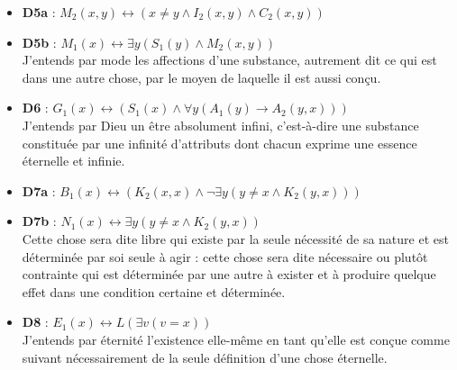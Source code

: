 \documentclass[10pt,a3paper]{article}
\begin{document}
\begin{itemize}
    \item \textbf{D5a} : $M_2(x,y) \leftrightarrow (x \neq y \land I_2(x,y) \land C_2(x,y))$ \\    
    \item \textbf{D5b} : $M_1(x) \leftrightarrow \exists y (S_1(y) \land M_2(x,y))$ \\
    J’entends par mode les affections d’une substance, autrement dit ce qui est dans une autre chose, par le moyen de laquelle il est aussi conçu.
    
    \item \textbf{D6} : $G_1(x) \leftrightarrow (S_1(x) \land \forall y (A_1(y) \rightarrow A_2(y,x)))$ \\
    J’entends par Dieu un être absolument infini, c’est-à-dire une substance constituée par une infinité d’attributs dont chacun exprime une essence éternelle et infinie.
    
    \item \textbf{D7a} : $B_1(x) \leftrightarrow (K_2(x,x) \land \neg \exists y (y \neq x \land K_2(y,x)))$ \\
    \item \textbf{D7b} : $N_1(x) \leftrightarrow \exists y (y \neq x \land K_2(y,x))$ \\
    Cette chose sera dite libre qui existe par la seule nécessité de sa nature et est déterminée par soi seule à agir : cette chose sera dite nécessaire ou plutôt contrainte qui est déterminée par une autre à exister et à produire quelque effet dans une condition certaine et déterminée.
    
    \item \textbf{D8} : $E_1(x) \leftrightarrow L(\exists v (v = x))$ \\
    J’entends par éternité l’existence elle-même en tant qu’elle est conçue comme suivant nécessairement de la seule définition d’une chose éternelle.
\end{itemize}
\end{document}
